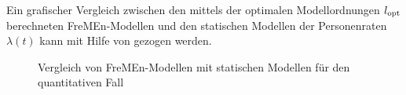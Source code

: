 Ein grafischer Vergleich zwischen den mittels der optimalen Modellordnungen $l_{\mathrm{opt}}$ berechneten FreMEn-Modellen und den statischen Modellen der Personenraten $\lambda (t)$ kann mit Hilfe von  gezogen werden. \\

\begin{figure}[!h]
	\centering
	
	\caption{Vergleich von FreMEn-Modellen mit statischen Modellen für den quantitativen Fall}
	\label{fig.float_fremen_vs_static}
\end{figure}

